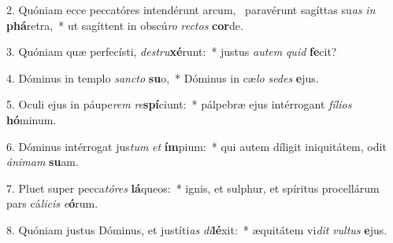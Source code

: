 2. Quóniam ecce peccatóres intendérunt arcum, \dag\  paravérunt sagíttas su\textit{as} \textit{in} \textbf{phá}retra,~*  ut sagíttent in obscú\textit{ro} \textit{rec}\textit{tos} \textbf{cor}de.\

3. Quóniam quæ perfecísti, \textit{de}\textit{stru}\textbf{xé}runt:~*  justus \textit{au}\textit{tem} \textit{quid} \textbf{fe}cit?\

4. Dóminus in templo \textit{sanc}\textit{to} \textbf{su}o,~*  Dóminus in cæ\textit{lo} \textit{se}\textit{des} \textbf{e}jus.\

5. Oculi ejus in páupe\textit{rem} \textit{re}\textbf{spí}ciunt:~*  pálpebræ ejus intérrogant \textit{fí}\textit{li}\textit{os} \textbf{hó}minum.\

6. Dóminus intérrogat jus\textit{tum} \textit{et} \textbf{ím}pium:~*  qui autem díligit iniquitátem, odit \textit{á}\textit{ni}\textit{mam} \textbf{su}am.\

7. Pluet super pecca\textit{tó}\textit{res} \textbf{lá}queos:~*  ignis, et sulphur, et spíritus procellárum pars cá\textit{li}\textit{cis} \textit{e}\textbf{ó}rum.\

8. Quóniam justus Dóminus, et justíti\textit{as} \textit{di}\textbf{lé}xit:~*  æquitátem vi\textit{dit} \textit{vul}\textit{tus} \textbf{e}jus.\


